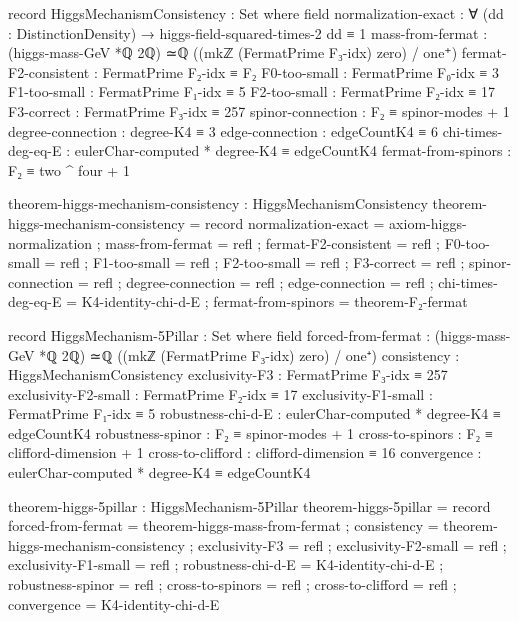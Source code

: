 \documentclass[11pt,a4paper]{book}
\begin{document}
\begin{code}
record HiggsMechanismConsistency : Set where
  field
    normalization-exact : ∀ (dd : DistinctionDensity) → 
                          higgs-field-squared-times-2 dd ≡ 1
    mass-from-fermat : (higgs-mass-GeV *ℚ 2ℚ) ≃ℚ ((mkℤ (FermatPrime F₃-idx) zero) / one⁺)
    fermat-F2-consistent : FermatPrime F₂-idx ≡ F₂
    F0-too-small : FermatPrime F₀-idx ≡ 3
    F1-too-small : FermatPrime F₁-idx ≡ 5
    F2-too-small : FermatPrime F₂-idx ≡ 17
    F3-correct : FermatPrime F₃-idx ≡ 257
    spinor-connection : F₂ ≡ spinor-modes + 1
    degree-connection : degree-K4 ≡ 3
    edge-connection : edgeCountK4 ≡ 6
    chi-times-deg-eq-E : eulerChar-computed * degree-K4 ≡ edgeCountK4
    fermat-from-spinors : F₂ ≡ two ^ four + 1

theorem-higgs-mechanism-consistency : HiggsMechanismConsistency
theorem-higgs-mechanism-consistency = record
  { normalization-exact = axiom-higgs-normalization
  ; mass-from-fermat = refl
  ; fermat-F2-consistent = refl
  ; F0-too-small = refl
  ; F1-too-small = refl
  ; F2-too-small = refl
  ; F3-correct = refl
  ; spinor-connection = refl
  ; degree-connection = refl
  ; edge-connection = refl
  ; chi-times-deg-eq-E = K4-identity-chi-d-E
  ; fermat-from-spinors = theorem-F₂-fermat
  }

record HiggsMechanism-5Pillar : Set where
  field
    forced-from-fermat  : (higgs-mass-GeV *ℚ 2ℚ) ≃ℚ ((mkℤ (FermatPrime F₃-idx) zero) / one⁺)
    consistency         : HiggsMechanismConsistency
    exclusivity-F3      : FermatPrime F₃-idx ≡ 257
    exclusivity-F2-small : FermatPrime F₂-idx ≡ 17
    exclusivity-F1-small : FermatPrime F₁-idx ≡ 5
    robustness-chi-d-E  : eulerChar-computed * degree-K4 ≡ edgeCountK4
    robustness-spinor   : F₂ ≡ spinor-modes + 1
    cross-to-spinors    : F₂ ≡ clifford-dimension + 1
    cross-to-clifford   : clifford-dimension ≡ 16
    convergence         : eulerChar-computed * degree-K4 ≡ edgeCountK4

theorem-higgs-5pillar : HiggsMechanism-5Pillar
theorem-higgs-5pillar = record
  { forced-from-fermat  = theorem-higgs-mass-from-fermat
  ; consistency         = theorem-higgs-mechanism-consistency
  ; exclusivity-F3      = refl
  ; exclusivity-F2-small = refl
  ; exclusivity-F1-small = refl
  ; robustness-chi-d-E  = K4-identity-chi-d-E
  ; robustness-spinor   = refl
  ; cross-to-spinors    = refl
  ; cross-to-clifford   = refl
  ; convergence         = K4-identity-chi-d-E
  }
\end{code}
\end{document}
